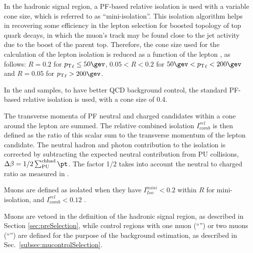 In the hadronic signal region, a PF-based relative isolation is used with a variable cone size, which is referred to as ``mini-isolation''. 
This isolation algorithm helps in recovering some efficiency in the lepton selection for boosted topology of top quark decays, 
in which the muon's track may be found close to the jet activity due to the boost of the parent top. 
Therefore, the cone size used for the calculation of the lepton isolation is reduced as a function of 
the lepton \Pt, as follows: $R=0.2$ for $\Pt_{\ell}\leq50\gev$, $0.05<R<0.2$ for $50 \gev < \Pt_{\ell} < 200\gev$ and $R=0.05$ for $\Pt_{\ell} > 200 \gev$.

In the \mj and \mmj samples, to have better QCD background control, the standard PF-based relative isolation is used, with a cone size of 0.4.

The transverse momenta of PF neutral and charged candidates within a cone around the lepton are summed. 
The relative combined isolation $I^{rel}_{comb}$ is then defined as 
the ratio of this scalar sum to the transverse momentum of the lepton candidate. 
The neutral hadron and photon contribution to the isolation is corrected 
by subtracting the expected neutral contribution from PU collisions, $\Delta\beta=1/2\sum_{\mathrm{PU}}^{\mathrm{ch had}}{\pt}$. 
The factor 1/2 takes into account the neutral to charged ratio as measured in \cite{CMS-PFT-10-002}. 

Muons are defined as isolated when they have $I^{mini}_{Iso} < 0.2$ within $R$ for mini-isolation, and $I^{rel}_{comb} < 0.12$ .


Muons are vetoed in the definition of the hadronic signal region, 
as described in Section \ref{sec:preSelection}, while 
control regions with one muon (``\mj'') or two muons (``\mmj'') are defined for the purpose of the background estimation, 
as described in Sec.~\ref{subsec:mucontrolSelection}.




